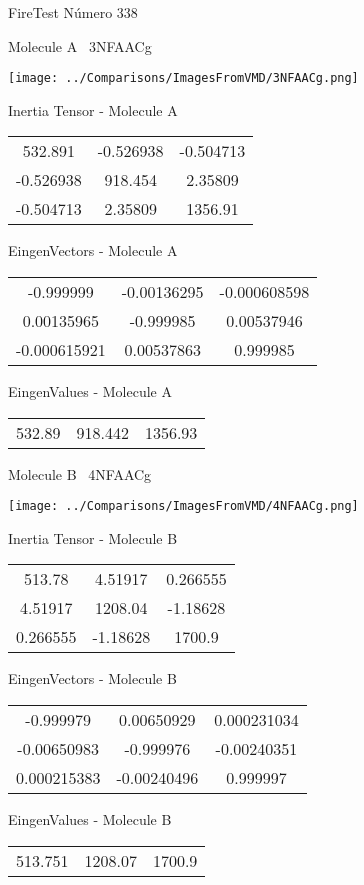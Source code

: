 \vtab[-3cm]
\begin{center}
{\large FireTest \tab Número 338}
\end{center}
\begin{multicols}{2}
\begin{center}

Molecule A \
3NFAACg

\texttt{[image: ../Comparisons/ImagesFromVMD/3NFAACg.png]}

Inertia Tensor - Molecule A \\
\begin{tabular}{|c c c|}
532.891	 & 	-0.526938	 & 	-0.504713	 \\
-0.526938	 & 	918.454	 & 	2.35809	 \\
-0.504713	 & 	2.35809	 & 	1356.91
\end{tabular}

\vtab
 EingenVectors - Molecule A     \\
\begin{tabular}{|c c c|}
-0.999999	 & 	-0.00136295	 & 	-0.000608598	 \\
0.00135965	 & 	-0.999985	 & 	0.00537946	 \\
-0.000615921	 & 	0.00537863	 & 	0.999985
\end{tabular}

\vtab
 EingenValues - Molecule A     \\
\begin{tabular}{|c c c|}
532.89	 & 	918.442	 & 	1356.93	 \\
\end{tabular}
\columnbreak

Molecule B \
4NFAACg

\texttt{[image: ../Comparisons/ImagesFromVMD/4NFAACg.png]}

Inertia Tensor - Molecule B \\
\begin{tabular}{|c c c|}
513.78	 & 	4.51917	 & 	0.266555	 \\
4.51917	 & 	1208.04	 & 	-1.18628	 \\
0.266555	 & 	-1.18628	 & 	1700.9
\end{tabular}

\vtab
 EingenVectors - Molecule B     \\
\begin{tabular}{|c c c|}
-0.999979	 & 	0.00650929	 & 	0.000231034	 \\
-0.00650983	 & 	-0.999976	 & 	-0.00240351	 \\
0.000215383	 & 	-0.00240496	 & 	0.999997
\end{tabular}

\vtab
 EingenValues - Molecule B     \\
\begin{tabular}{|c c c|}
513.751	 & 	1208.07	 & 	1700.9	 \\
\end{tabular}

\end{center}
\end{multicols}

